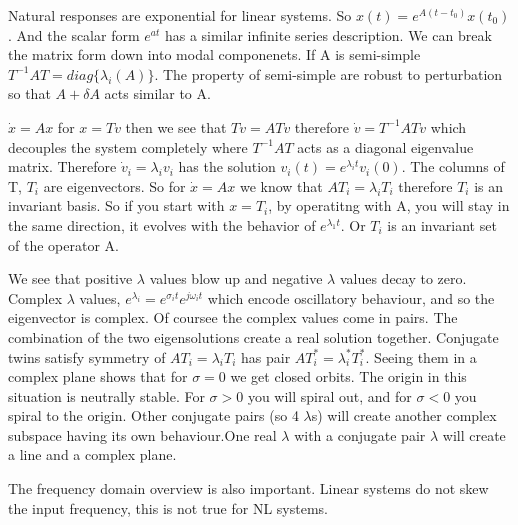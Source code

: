 \documentclass[11pt]{article}
\begin{document}
Natural responses are exponential for linear systems. So $x(t) = e^{A(t-t_0)}x(t_0)$. And the scalar form $e^{at}$ has a similar infinite series description. We can break the matrix form down into modal componenets. If A is semi-simple $T^{-1}AT=diag\{\lambda_i(A)\}$. The property of semi-simple are robust to perturbation so that $A+\delta A$ acts similar to A. 

$\dot{x} = Ax$ for $x = Tv$ then we see that $T\dot{v} = ATv$ therefore $\dot{v} = T^{-1}ATv$ which decouples the system completely where $T^{-1}AT$ acts as a diagonal eigenvalue matrix. Therefore $\dot{v}_i = \lambda_iv_i$ has the solution $v_i(t) = e^{\lambda_i t}v_i(0)$. The columns of T, $T_i$ are eigenvectors. So for $\dot{x}=Ax$ we know that $AT_i = \lambda_iT_i$ therefore $T_i$ is an invariant basis. So if you start with $x=T_i$, by operatitng with A, you will stay in the same direction, it evolves with the behavior of $e^{\lambda_1t}$. Or $T_i$ is an invariant set of the operator A. 

We see that positive $\lambda$ values blow up and negative $\lambda$ values decay to zero. Complex $\lambda$ values, $e^{\lambda_i} = e^{\sigma_it}e^{j\omega_i t}$ which encode oscillatory behaviour, and so the eigenvector is complex. Of coursee the complex values come in pairs. The combination of the two eigensolutions create a real solution together. Conjugate twins satisfy symmetry of $AT_i = \lambda_iT_i$ has pair $AT_i^* = \lambda_i^*T_i^*$. Seeing them in a complex plane shows that for $\sigma=0$ we get closed orbits. The origin in this situation is neutrally stable. For $\sigma>0$ you will spiral out, and for $\sigma<0$ you spiral to the origin. Other conjugate pairs (so 4 $\lambda$s) will create another complex subspace having its own behaviour.One real $\lambda$ with a conjugate pair $\lambda$ will create a line and a complex plane. 

The frequency domain overview is also important. Linear systems do not skew the input frequency, this is not true for NL systems.
\end{document}
